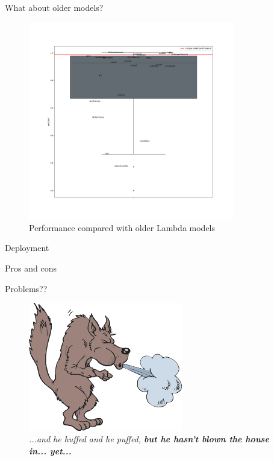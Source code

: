 \documentclass[9pt]{beamer}
\begin{document}
\begin{frame}{What about older models?}
\begin{figure}
		\includegraphics[width=0.8\textwidth, trim={0 4cm 0 2cm}, clip]{imgs/comparison.png}
		\caption{Performance compared with older Lambda models}
	\end{figure}
\end{frame}




\begin{frame}{Deployment}

\end{frame}


\begin{frame}{Pros and cons}
\end{frame}



\begin{frame}{Problems??}
	\begin{center}
		\begin{figure}
			\includegraphics[width=0.6\textwidth,height=!]{imgs/huffedandpuffed.png}
			\caption{\textit{...and he huffed and he puffed, \textbf{but he hasn't blown the house in... yet...}}}
		\end{figure}
	\end{center}
\end{frame}
\end{document}
